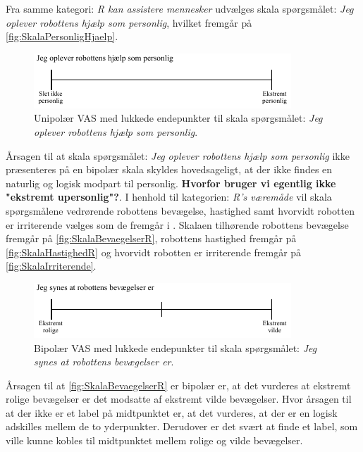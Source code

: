 Fra samme kategori: \textit{R kan assistere mennesker} udvælges skala spørgsmålet: \textit{Jeg oplever robottens hjælp som personlig}, hvilket fremgår på \autoref{fig:SkalaPersonligHjaelp}.
%
\begin{figure}[H]
\centering
\includegraphics[width =\textwidth]{Figure/UdvalgteSkalaer/PersonligHjaelp} 
\caption{Unipolær VAS med lukkede endepunkter til skala spørgsmålet: \textit{Jeg oplever robottens hjælp som personlig}.}
\label{fig:SkalaPersonligHjaelp}
\end{figure}
\noindent
%
Årsagen til at skala spørgsmålet: \textit{Jeg oplever robottens hjælp som personlig} ikke præsenteres på en bipolær skala skyldes hovedsageligt, at der ikke findes en naturlig og logisk modpart til personlig. \textbf{Hvorfor bruger vi egentlig ikke "ekstremt upersonlig"?}.\blankline
%
I henhold til kategorien: \textit{R's væremåde} vil skala spørgsmålene vedrørende robottens bevægelse, hastighed samt hvorvidt robotten er irriterende vælges som de fremgår i . Skalaen tilhørende robottens bevægelse fremgår på \autoref{fig:SkalaBevaegelserR}, robottens hastighed fremgår på \autoref{fig:SkalaHastighedR} og hvorvidt robotten er irriterende fremgår på \autoref{fig:SkalaIrriterende}.  
%
\begin{figure}[H]
\centering
\includegraphics[width =\textwidth]{Figure/UdvalgteSkalaer/BevaegelserR} 
\caption{Bipolær VAS med lukkede endepunkter til skala spørgsmålet: \textit{Jeg synes at robottens bevægelser er}.}
\label{fig:SkalaBevaegelserR}
\end{figure}
\noindent
%
Årsagen til at \autoref{fig:SkalaBevaegelserR} er bipolær er, at det vurderes at ekstremt rolige bevægelser er det modsatte af ekstremt vilde bevægelser. Hvor årsagen til at der ikke er et label på midtpunktet er, at det vurderes, at der er en logisk adskilles mellem de to yderpunkter. Derudover er det svært at finde et label, som ville kunne kobles til midtpunktet mellem rolige og vilde bevægelser.
